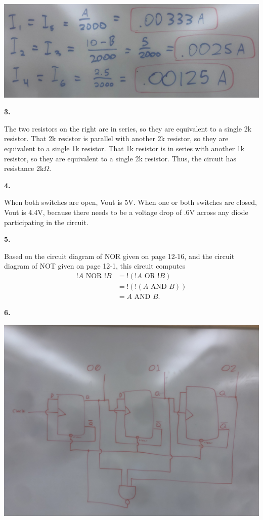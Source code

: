 \documentclass{article}
\begin{document}
\begin{center}
        \includegraphics[scale=.1]{IMG_0871.jpg}
    \end{center}

\newpage\noindent\textbf{3.}

    The two resistors on the right are in series, so they are equivalent to a single 2k resistor.
    That 2k resistor is parallel with another 2k resistor, so they are equivalent to a single 1k resistor.
    That 1k resistor is in series with another 1k resistor, so they are equivalent to a single 2k resistor.
    Thus, the circuit has resistance 2k$\Omega$.

\newpage\noindent\textbf{4.}

	When both switches are open, Vout is 5V. When one or both switches are closed, Vout is 4.4V, because there needs to be a voltage drop of .6V across any diode participating in the circuit.

\newpage\noindent\textbf{5.}

	Based on the circuit diagram of NOR given on page 12-16, and the circuit diagram of NOT given on page 12-1, this circuit computes
	\begin{align*}
		!A \text{ NOR } !B &= !(!A \text{ OR } !B) \\
				 &= !(!(A \text{ AND } B)) \\
				 &= A \text{ AND } B.
	\end{align*}

\newpage\noindent\textbf{6.}

    \begin{center} \includegraphics[scale=.1]{IMG_0872.jpg} \end{center}
\end{document}
